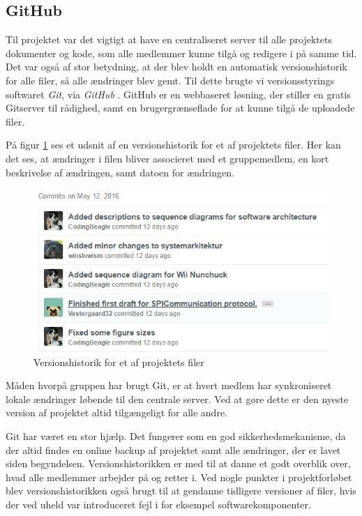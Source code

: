 \subsection{GitHub}
Til projektet var det vigtigt at have en centraliseret server til alle projektets dokumenter og kode, som alle medlemmer kunne tilgå og redigere i på samme tid. Det var også af stor betydning, at der blev holdt en automatisk versionshistorik for alle filer, så alle ændringer blev gemt. Til dette brugte vi versionsstyrings softwaret \textit{Git}, via \textit{GitHub} \cite{git}. GitHub er en webbaseret løsning, der stiller en gratis Gitserver til rådighed, samt en brugergrænseflade for at kunne tilgå de uploadede filer. \newline

\noindent På figur \ref{ref:GitHubHistorik} ses et udsnit af en versionshistorik for et af projektets filer. Her kan det ses, at ændringer i filen bliver associeret med et gruppemedlem, en kort beskrivelse af ændringen, samt datoen for ændringen.

\begin{figure}[H]
	\centering
	\includegraphics[width=\textwidth]{Projektgennemfoerelse/images/GitHubHistorik}
	\caption{Versionshistorik for et af projektets filer}
	\label{ref:GitHubHistorik}
\end{figure}

\noindent Måden hvorpå gruppen har brugt Git, er at hvert medlem har synkroniseret lokale ændringer løbende til den centrale server. Ved at gøre dette er den nyeste version af projektet altid tilgængeligt for alle andre. \newline

\noindent Git har været en stor hjælp. Det fungerer som en god sikkerhedsmekanisme, da der altid findes en online backup af projektet samt alle ændringer, der er lavet siden begyndelsen. Versionshistorikken er med til at danne et godt overblik over, hvad alle medlemmer arbejder på og retter i. Ved nogle punkter i projektforløbet blev versionshistorikken også brugt til at gendanne tidligere versioner af filer, hvis der ved uheld var introduceret fejl i for eksempel softwarekomponenter. \newline

